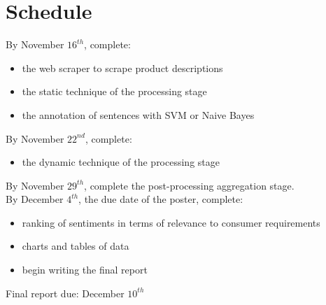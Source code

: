 \documentclass{article}
\begin{document}
\section{Schedule}

By November $16^{th}$, complete:
\begin{itemize}
\item the web scraper to scrape product descriptions
\item the static technique of the processing stage 
\item the annotation of sentences with SVM or Naive Bayes 
\end{itemize}
By November $22^{nd}$, complete:
\begin{itemize}
\item the dynamic technique of the processing stage
\end{itemize}
By November $29^{th}$, complete the post-processing aggregation stage.
\newline \\
By December $4^{th}$, the due date of the poster, complete:
\begin{itemize}
\item 
ranking of sentiments in terms of relevance to consumer requirements 
\item charts and tables of data
\item begin writing the final report 
\end{itemize}

Final report due: December $10^{th}$
\end{document}
